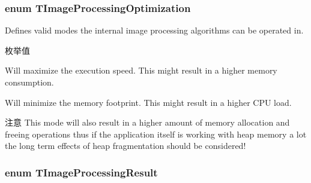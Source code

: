 \hypertarget{group___common_interface_ga9f8538d596e064d7854f355679357965}{
\subsubsection[{T\+Image\+Processing\+Optimization}]{\setlength{\rightskip}{0pt plus 5cm}enum {\bf T\+Image\+Processing\+Optimization}}}\label{group___common_interface_ga9f8538d596e064d7854f355679357965}


Defines valid modes the internal image processing algorithms can be operated in. 

\begin{Desc}
\item[枚举值]\par
\begin{description}
\item[{\em 
\hypertarget{group___common_interface_gga9f8538d596e064d7854f355679357965a88d24efe19e3b4a7b794eecb012b7bf9}{ipo\+Maximize\+Speed}\label{group___common_interface_gga9f8538d596e064d7854f355679357965a88d24efe19e3b4a7b794eecb012b7bf9}
}]Will maximize the execution speed. This might result in a higher memory consumption. \item[{\em 
\hypertarget{group___common_interface_gga9f8538d596e064d7854f355679357965a5914c1be72745156bd13890a3f72f150}{ipo\+Minimize\+Memory\+Usage}\label{group___common_interface_gga9f8538d596e064d7854f355679357965a5914c1be72745156bd13890a3f72f150}
}]Will minimize the memory footprint. This might result in a higher C\+P\+U load. \begin{DoxyAttention}{注意}
This mode will also result in a higher amount of memory allocation and freeing operations thus if the application itself is working with heap memory a lot the long term effects of heap fragmentation should be considered! 
\end{DoxyAttention}
\end{description}
\end{Desc}
\hypertarget{group___common_interface_gac868128de70336bbecd2efbb80ee1309}{
\subsubsection[{T\+Image\+Processing\+Result}]{\setlength{\rightskip}{0pt plus 5cm}enum {\bf T\+Image\+Processing\+Result}}}\label{group___common_interface_gac868128de70336bbecd2efbb80ee1309}


